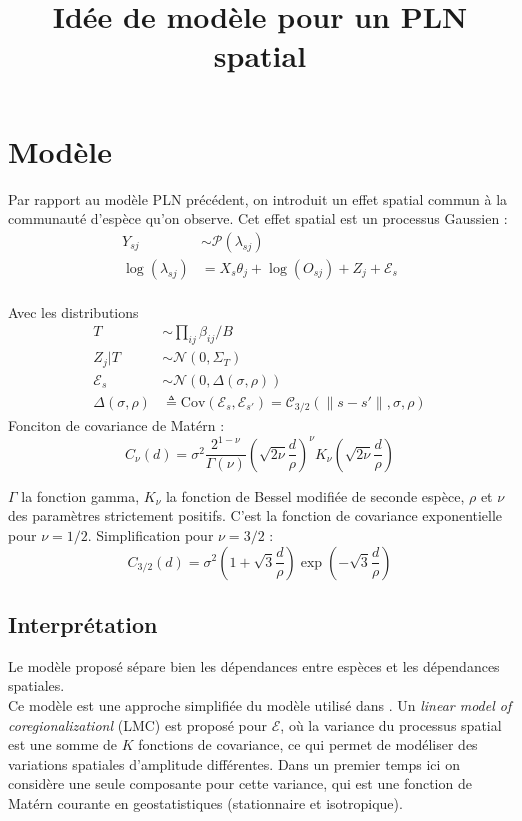 \documentclass[10pt,a4paper]{article}
\title{Idée de modèle pour un PLN spatial}
\newcommand{\pois}{\mathcal{P}}
\newcommand{\e}{\mathcal{E}}
\newcommand{\norm}{\mathcal{N}}
\newcommand{\Cov}{\mathrm{Cov}}
\begin{document}
\maketitle

\section{Modèle}
Par rapport au modèle PLN précédent, on  introduit un effet spatial commun à la communauté d'espèce qu'on observe. Cet effet spatial est un processus Gaussien :
\begin{align*}
Y_{sj} &\sim \pois(\lambda_{sj})\\
\log(\lambda_{sj}) &= X_s\theta_j + \log(O_{sj}) + Z_j + \e_s \\
\end{align*}

Avec les distributions 
\begin{align*}
T &\sim \prod_{ij} \beta_{ij} /B\\
Z_j|T &\sim \norm(0,\Sigma_T)\\
\e_s &\sim \norm(0,\Delta(\sigma,\rho))\\
\Delta(\sigma,\rho)&\triangleq  \Cov(\e_s,\e_{s'}) = \mathcal{C}_{3/2}(\lVert s-s' \rVert , \sigma, \rho)
\end{align*}
Fonciton de covariance de Matérn : 
$$C_\nu(d) = \sigma^2 \frac{2^{1-\nu}}{\Gamma(\nu)}\left(\sqrt{2\nu}\frac{d}{\rho}\right)^\nu K_\nu \left(\sqrt{2\nu}\frac{d}{\rho}\right)$$

$\Gamma$ la fonction gamma, $K_\nu$ la fonction de Bessel modifiée de seconde espèce, $\rho$ et $\nu$ des paramètres strictement positifs. C'est la fonction de covariance exponentielle pour $ \nu=1/2$.
Simplification pour $\nu = 3/2$ :
$$ C_{3/2}(d) = \sigma^2\left (1+\sqrt{3}\frac{d}{\rho}\right )\exp\left(-\sqrt{3} \frac{d}{\rho}\right)$$
\subsection{Interprétation}
Le modèle proposé sépare bien les dépendances entre espèces et les dépendances spatiales.\\

Ce modèle est une approche simplifiée du modèle utilisé dans \cite{Zhang}. Un \textit{linear model of coregionalizationl} (LMC) est proposé pour $\e$, où la variance du processus spatial est une somme de $K$ fonctions de covariance, ce qui permet de modéliser des variations spatiales d'amplitude différentes. Dans un premier temps ici on considère une seule composante pour cette variance, qui est une fonction de Matérn courante en geostatistiques (stationnaire et isotropique).\\
\end{document}

